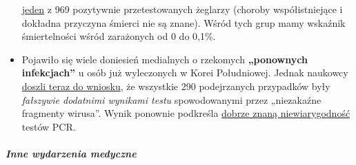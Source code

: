 \begin{itemize}
  \href{https://en.wikipedia.org/wiki/COVID-19_pandemic_on_USS_Theodore_Roosevelt}{jeden}
  z 969 pozytywnie przetestowanych żeglarzy (choroby współistniejące i
  dokładna przyczyna śmierci nie są znane). Wśród tych grup mamy
  wskaźnik śmiertelności wśród zarażonych od 0 do 0,1\%.
\item
  Pojawiło się wiele doniesień medialnych o rzekomych \textbf{„ponownych
  infekcjach''} u osób już wyleczonych w Korei Południowej. Jednak
  naukowcy
  \href{https://www.independent.co.uk/news/world/asia/coronavirus-south-korea-patients-infected-twice-test-a9491986.html}{doszli
  teraz do wniosku}, że wszystkie 290 podejrzanych przypadków były
  \emph{fałszywie dodatnimi wynikami testu} spowodowanymi przez
  „niezakaźne fragmenty wirusa''. Wynik ponownie podkreśla
  \href{https://www.ncbi.nlm.nih.gov/pubmed/32219885}{dobrze znaną
  niewiarygodność} testów PCR.
\end{itemize}

\hypertarget{inne-wydarzenia-medyczne}{%
\subparagraph{\texorpdfstring{\textbf{Inne wydarzenia
medyczne}}{Inne wydarzenia medyczne}}\label{inne-wydarzenia-medyczne}}

